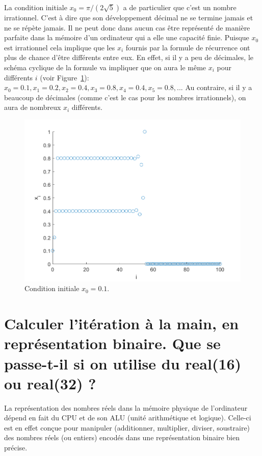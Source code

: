 \documentclass[a4paper, 12pt]{report}
\begin{document}
La condition initiale $x_0 = \pi/(2 \sqrt{5})$ a de particulier que
c'est un nombre irrationnel. C'est à dire que son développement décimal ne
se termine jamais et ne se répète jamais. Il ne peut donc dans aucun cas
être représenté de manière parfaite dans la mémoire d'un ordinateur qui a elle
une capacité finie. Puisque $x_0$ est irrationnel cela implique que les $x_i$
fournis par la formule de récurrence ont plus de chance d'être différents entre
eux. En effet, si il y a peu de décimales, le schéma cyclique de la formule
va impliquer que on aura le même $x_i$ pour différents $i$ (voir Figure~\ref{fig:predict_x0_0_dot_1}): $x_0=0.1, x_1 = 0.2,x_2 = 0.4,x_3 = 0.8, x_4=0.4, x_5=0.8,...$
Au contraire, si il y a beaucoup de décimales (comme c'est le cas pour
les nombres irrationnels), on aura de nombreux $x_i$ différents.

\begin{figure}[H]
    \centering
    \includegraphics{images/x0_0dot1_i_x_i.png}
    \caption{Condition initiale $x_0 = 0.1$.}
    \label{fig:predict_x0_0_dot_1}
\end{figure}

\section{Calculer l'itération à la main, en représentation binaire.
Que se passe-t-il si on utilise du real(16) ou real(32) ?}

La représentation des nombres réels dans la mémoire physique de l'ordinateur dépend
en fait du CPU et de son ALU (unité arithmétique et logique). Celle-ci est
en effet conçue pour manipuler (additionner, multiplier, diviser, soustraire)
des nombres réels (ou entiers) encodés dans une représentation binaire bien
précise.
\end{document}
